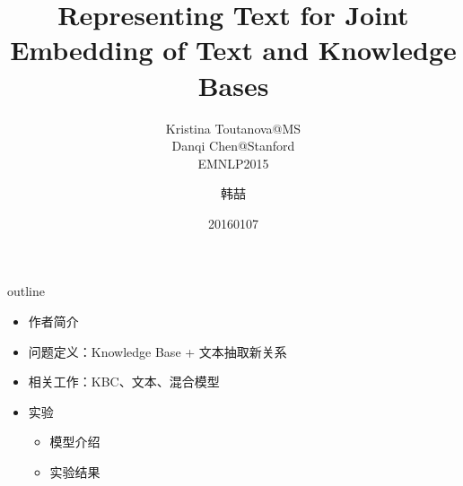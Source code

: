 \documentclass[color=usenames,dvipsnames]{beamer}
\title[KBText Embed]{Representing Text for Joint Embedding of Text and Knowledge Bases}
\subtitle{Kristina Toutanova@MS\\ Danqi Chen@Stanford\\ EMNLP2015}
\author{韩喆}
\institute{ICSTWIP}
\date{20160107}
\begin{document}
\begin{frame}
  \titlepage
\end{frame}


\begin{frame}{outline}
 \begin{itemize}
  \item 作者简介
  \item 问题定义：Knowledge Base + 文本抽取新关系
  \item 相关工作：KBC、文本、混合模型
  \item 实验
    \begin{itemize}
     \item 模型介绍
     \item 实验结果
    \end{itemize}
 \end{itemize}

\end{frame}
\end{document}
